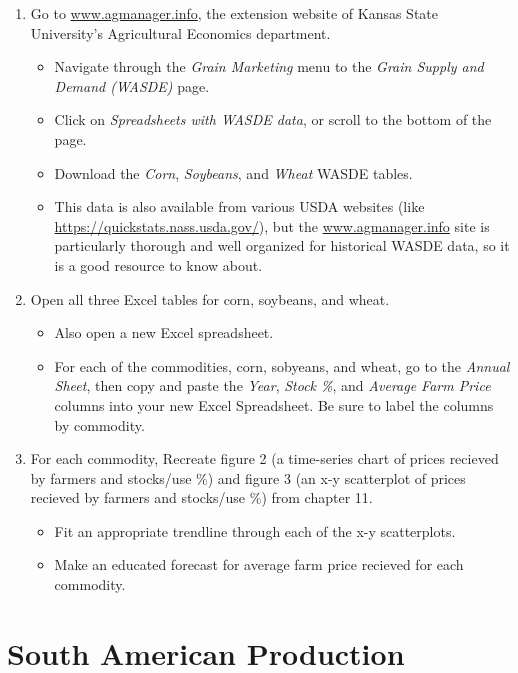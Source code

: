 \documentclass[
]{book}
\begin{document}
\begin{enumerate}
\def\labelenumi{\arabic{enumi}.}
\item
  Go to \url{www.agmanager.info}, the extension website of Kansas State University's Agricultural Economics department.

  \begin{itemize}
  \item
    Navigate through the \emph{Grain Marketing} menu to the \emph{Grain Supply and Demand (WASDE)} page.
  \item
    Click on \emph{Spreadsheets with WASDE data}, or scroll to the bottom of the page.
  \item
    Download the \emph{Corn}, \emph{Soybeans}, and \emph{Wheat} WASDE tables.
  \item
    This data is also available from various USDA websites (like \url{https://quickstats.nass.usda.gov/}), but the \href{agmanager.info}{www.agmanager.info} site is particularly thorough and well organized for historical WASDE data, so it is a good resource to know about.
  \end{itemize}
\item
  Open all three Excel tables for corn, soybeans, and wheat.

  \begin{itemize}
  \item
    Also open a new Excel spreadsheet.
  \item
    For each of the commodities, corn, sobyeans, and wheat, go to the \emph{Annual Sheet}, then copy and paste the \emph{Year}, \emph{Stock \%}, and \emph{Average Farm Price} columns into your new Excel Spreadsheet. Be sure to label the columns by commodity.
  \end{itemize}
\item
  For each commodity, Recreate figure 2 (a time-series chart of prices recieved by farmers and stocks/use \%) and figure 3 (an x-y scatterplot of prices recieved by farmers and stocks/use \%) from chapter 11.

  \begin{itemize}
  \item
    Fit an appropriate trendline through each of the x-y scatterplots.
  \item
    Make an educated forecast for average farm price recieved for each commodity.
  \end{itemize}
\end{enumerate}

\hypertarget{south-american-production}{%
\chapter{South American Production}\label{south-american-production}}
\end{document}

